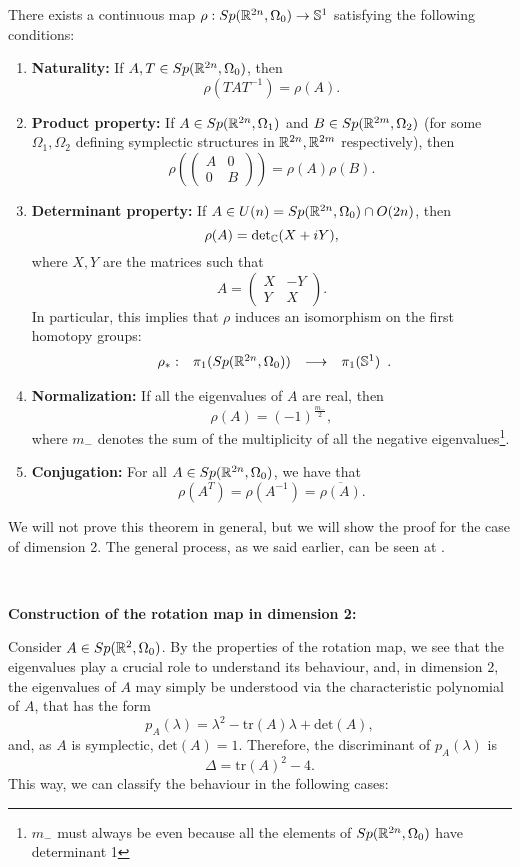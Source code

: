 \begin{theo}
There exists a continuous map $\rho : Sp(\mathbb{R}^{2n},\Omega_0) \rightarrow \mathbb{S}^1$ satisfying the following conditions:
\begin{enumerate}
	\item {\bf Naturality:} If $A,T \in Sp(\mathbb{R}^{2n},\Omega_0)$, then
	\[\rho(TAT^{-1}) = \rho(A) .\]
	\item {\bf Product property:} If $A \in Sp(\mathbb{R}^{2n},\Omega_1)$ and $B \in Sp(\mathbb{R}^{2m},\Omega_2)$ (for some $\Omega_1, \Omega_2$ defining symplectic structures in $\mathbb{R}^{2n}, \mathbb{R}^{2m}$ respectively), then
	\[\rho\left(\begin{pmatrix}A & 0 \\ 0 & B\end{pmatrix}\right) = \rho(A) \rho(B) .\]
	\item {\bf Determinant property:} If $A \in U(n) = Sp(\mathbb{R}^ {2n},\Omega_0) \cap O(2n)$, then
	\[\rho(A) = \text{det}_{\mathbb{C}}(X+iY),\]
	where $X,Y$ are the matrices such that
	\[A = \begin{pmatrix} X & -Y \\ Y & X \end{pmatrix}.\]
	In particular, this implies that $\rho$ induces an isomorphism on the first homotopy groups:
	\[\begin{array}{rccc} \rho_{\ast} : & \pi_1(Sp(\mathbb{R}^{2n},\Omega_0)) & \longrightarrow & \pi_1(\mathbb{S}^1) \end{array} .\]
	\item {\bf Normalization:} If all the eigenvalues of $A$ are real, then
	\[\rho(A) = (-1)^{\frac{m_{-}}2},\]
	where $m_{-}$ denotes the sum of the multiplicity of all the negative eigenvalues\footnote{$m_{-}$ must always be even because all the elements of $Sp(\mathbb{R}^{2n},\Omega_0)$ have determinant 1}.
	\item {\bf Conjugation:} For all $A \in Sp(\mathbb{R}^{2n},\Omega_0)$, we have that
	\[\rho(A^T) = \rho(A^{-1}) = \overline{\rho(A)} .\]
\end{enumerate}

\end{theo}

We will not prove this theorem in general, but we will show the proof for the case of dimension 2. The general process, as we said earlier, can be seen at \cite{gutt2012conley}.

\

{\bf Construction of the rotation map in dimension 2:}

Consider $A \in Sp(\mathbb{R}^2,\Omega_0)$. By the properties of the rotation map, we see that the eigenvalues play a crucial role to understand its behaviour, and, in dimension 2, the eigenvalues of $A$ may simply be understood via the characteristic polynomial of $A$, that has the form
\[p_A(\lambda) = \lambda^2 - \text{tr}(A) \lambda + \text{det}(A) ,\]
and, as $A$ is symplectic, $\text{det}(A) = 1$. Therefore, the discriminant of $p_A(\lambda)$ is
\[\Delta = \text{tr}(A)^2 - 4 .\]
This way, we can classify the behaviour in the following cases:

